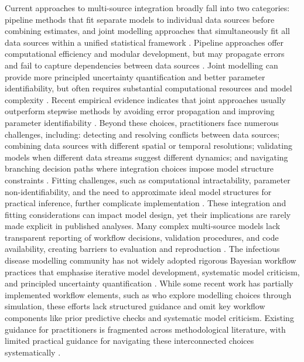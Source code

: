 \documentclass{article}
\begin{document}
Current approaches to multi-source integration broadly fall into two categories: pipeline methods that fit separate models to individual data sources before combining estimates, and joint modelling approaches that simultaneously fit all data sources within a unified statistical framework \citep{deangelis2018analysing, russell2024combined}.
Pipeline approaches offer computational efficiency and modular development, but may propagate errors and fail to capture dependencies between data sources \citep{lison2024generative, Ward2024-sp}.
Joint modelling can provide more principled uncertainty quantification and better parameter identifiability, but often requires substantial computational resources and model complexity \citep{russell2024combined, lison2024generative}.
Recent empirical evidence indicates that joint approaches usually outperform stepwise methods by avoiding error propagation and improving parameter identifiability \citep{lison2024generative}.
Beyond these choices, practitioners face numerous challenges, including: detecting and resolving conflicts between data sources; combining data sources with different spatial or temporal resolutions; validating models when different data streams suggest different dynamics; and navigating branching decision paths where integration choices impose model structure constraints \citep{deangelis2018analysing, nicholson2022interoperability}.
Fitting challenges, such as computational intractability, parameter non-identifiability, and the need to approximate ideal model structures for practical inference, further complicate implementation \citep{corbella2022inferring, Ward2024-sp}.
These integration and fitting considerations can impact model design, yet their implications are rarely made explicit in published analyses.
Many complex multi-source models lack transparent reporting of workflow decisions, validation procedures, and code availability, creating barriers to evaluation and reproduction \citep{Ward2024-sp, Fyles2024-qz, Abbott2021-delta, Abbott2022-prevalence}.
The infectious disease modelling community has not widely adopted rigorous Bayesian workflow practices that emphasise iterative model development, systematic model criticism, and principled uncertainty quantification \citep{gelman2020bayesian, nicholson2022interoperability}.
While some recent work has partially implemented workflow elements, such as \citet{bouman2024bayesian} who explore modelling choices through simulation, these efforts lack structured guidance and omit key workflow components like prior predictive checks and systematic model criticism.
Existing guidance for practitioners is fragmented across methodological literature, with limited practical guidance for navigating these interconnected choices systematically \citep{nicholson2022interoperability, deangelis2018analysing}.
\end{document}
